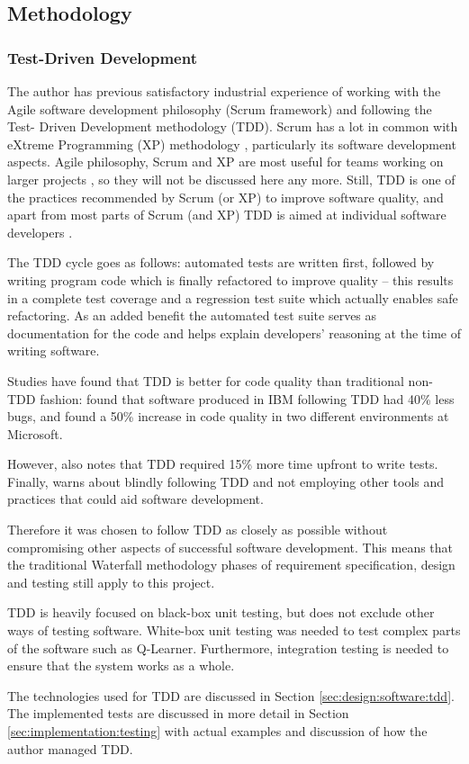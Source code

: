 \subsection{Methodology}

\subsubsection{Test-Driven Development}
\label{sec:design:tdd}

The author has previous satisfactory industrial experience of working with the
Agile software development philosophy (Scrum framework) and following the Test-
Driven Development methodology (TDD). Scrum has a lot in common with eXtreme
Programming (XP) methodology \parencite{Copeland2001xp}, particularly its
software development aspects. Agile philosophy, Scrum and XP are most useful
for teams working on larger projects \parencite{Cohn2010agile}, so they will
not be discussed here any more. Still, TDD is one of the practices recommended
by Scrum (or XP) to improve software quality, and apart from most parts of
Scrum (and XP) TDD is aimed at individual software developers
\parencite{Beck2000xp, Cohn2010agile}.

The TDD cycle goes as follows: automated tests are written first, followed by
writing program code which is finally refactored to improve quality -- this
results in a complete test coverage and a regression test suite which actually
enables safe refactoring. As an added benefit the automated test suite serves
as documentation for the code and helps explain developers' reasoning at the
time of writing software. \parencite{Beck2000xp}

Studies have found that TDD is better for code quality than traditional non-TDD
fashion: \textcite{Williams2003test} found that software produced in IBM
following TDD had 40\% less bugs, and \textcite{Bhat2006tdd} found a 50\%
increase in code quality in two different environments at Microsoft.

However, \textcite{Bhat2006tdd} also notes that TDD required 15\% more time
upfront to write tests. Finally, \textcite{Dhh2014tdd} warns about blindly
following TDD and not employing other tools and practices that could aid
software development.

Therefore it was chosen to follow TDD as closely as possible without
compromising other aspects of successful software development. This means that
the traditional Waterfall methodology phases of requirement specification,
design and testing still apply to this project.

TDD is heavily focused on black-box unit testing, but does not exclude other
ways of testing software. White-box unit testing was needed to test complex
parts of the software such as Q-Learner. Furthermore, integration testing is
needed to ensure that the system works as a whole.

The technologies used for TDD are discussed in Section
\ref{sec:design:software:tdd}. The implemented tests are discussed in more
detail in Section \ref{sec:implementation:testing} with actual examples and
discussion of how the author managed TDD.
